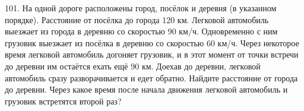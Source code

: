 101. На одной дороге расположены город, посёлок и деревня (в указанном порядке). Расстояние от посёлка до города 120 км. Легковой автомобиль выезжает из города в деревню со скоростью 90 км/ч. Одновременно с ним грузовик выезжает из посёлка в деревню со скоростью 60 км/ч. Через некоторое время легковой автомобиль догоняет грузовик, и в этот момент от точки встречи до деревни им остаётся ехать ещё 90 км. Доехав до деревни, легковой автомобиль сразу разворачивается и едет обратно. Найдите расстояние от города до деревни. Через какое время после начала движения легковой автомобиль и грузовик встретятся второй раз?\\
